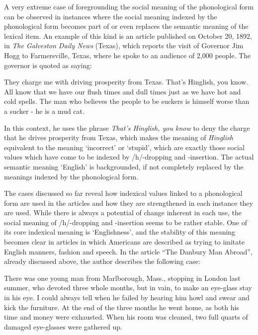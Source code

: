 A very extreme case of foregrounding the social meaning of the phonological form can be observed in instances where the social meaning indexed by the phonological form becomes part of or even replaces the semantic meaning of the lexical item. An example of this kind is an article published on October 20, 1892, in \emph{The Galveston Daily News} (Texas), which reports the visit of Governor Jim Hogg to Farmersville, Texas, where he spoke to an audience of 2,000 people. The governor is quoted as saying:

\begin{ipquote}
They charge me with driving prosperity from Texas. That's Hinglish, you know. All know that we have our flush times and dull times just as we have hot and cold spells. The man who believes the people to be suckers is himself worse than a sucker - he is a mud cat.
\end{ipquote}


In this context, he uses the phrase \emph{That’s Hinglish, you know} to deny the charge that he drives prosperity from Texas, which makes the meaning of \emph{Hinglish} equivalent to the meaning ‘incorrect’ or ‘stupid’, which are exactly those social values which have come to be indexed by /h/-dropping and -insertion. The actual semantic meaning ‘English’ is backgrounded, if not completely replaced by the meanings indexed by the phonological form.


The cases discussed so far reveal how indexical values linked to a phonological form are used in the articles and how they are strengthened in each instance they are used. While there is always a potential of change inherent in each use, the social meaning of /h/-dropping and -insertion seems to be rather stable. One of its core indexical meaning is ‘Englishness’, and the stability of this meaning becomes clear in articles in which Americans are described as trying to imitate English manners, fashion and speech. In the article “The Danbury Man Abroad”, already discussed above, the author describes the following case:

\begin{ipquote}
There was one young man from Marlborough, Mass., stopping in London last summer, who devoted three whole months, but in vain, to make an eye-glass stay in his eye. I could always tell when he failed by hearing him howl and swear and kick the furniture. At the end of the three months he went home, as both his time and money were exhausted. When his room was cleaned, two full quarts of damaged eye-glasses were gathered up.
\end{ipquote}


